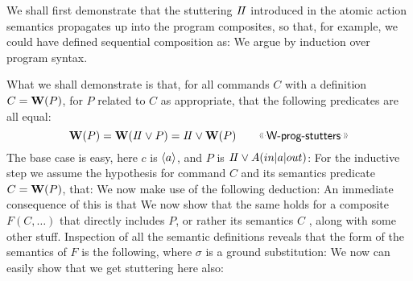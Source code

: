 We shall first demonstrate that the stuttering $I\!I$
introduced in the atomic action semantics
propagates up into the program composites,
so that, for example, we could have defined sequential composition
as:
We argue by induction over program syntax.

What we shall demonstrate is that, for all commands $C$
with a definition $C = \mathbf{W}(P)$, for $P$ related to $C$ as appropriate,
that the following predicates are all equal:
\[
  \W(P) =  \W(\Skip \lor P) = \Skip \lor \W(P)
  \qquad \elabel{W-prog-stutters}
\]
The base case is easy, here $c$ is $\langle a\rangle$,
and $P$ is $I\!I \lor A(in|a|out)$:
For the inductive step we assume the hypothesis
for command $C$ and its semantics predicate  $C = \mathbf{W}(P)$,
that:
We now make use of the following deduction:
An immediate consequence of this is that
We now show that the same holds for a composite $F(C,\ldots)$
that directly includes $P$, or rather its semantics $C$
, along with some other stuff.
Inspection of all the semantic definitions reveals
that the form of the semantics of $F$ is the following,
where $\sigma$ is a ground substitution:
We now can easily show that we get stuttering here also:

